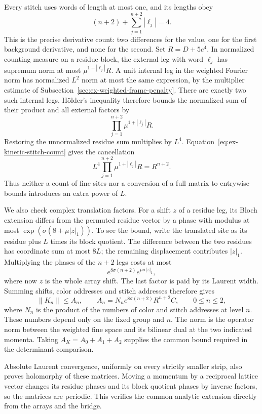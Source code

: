 Every stitch uses words of length at most one, and its lengths obey
\begin{equation}\label{eq:ex-kinetic-stitch-count}
                  (n+2)+\sum_{j=1}^{n+2}|\ell_j|=4.
\end{equation}
This is the precise derivative count: two differences for the value,
one for the first background derivative, and none for the second.
Set $R=D+5e^4$. In normalized counting measure on a residue block,
the external leg with word $\ell_j$ has supremum norm at most
$\mu^{1+|\ell_j|}R$. A unit internal leg in the weighted Fourier
norm has normalized $L^2$ norm at most the same expression, by
the multiplier estimate of
Subsection~\ref{sec:ex-weighted-frame-penalty}. There are exactly
two such internal legs. H\"older's inequality therefore bounds
the normalized sum of their product and all external factors by
\[
                         \prod_{j=1}^{n+2}\mu^{1+|\ell_j|}R.
\]
Restoring the unnormalized residue sum multiplies by $L^4$.
Equation~\eqref{eq:ex-kinetic-stitch-count} gives the cancellation
\[
        L^4\prod_{j=1}^{n+2}\mu^{1+|\ell_j|}R=R^{n+2}.
\]
Thus neither a count of fine sites nor a conversion of a full
matrix to entrywise bounds introduces an extra power of $L$.

We also check complex translation factors. For a shift $z$ of a
residue leg, its Bloch extension differs from the permuted residue
vector by a phase with modulus at most
$\exp(\sigma(8+\mu|z|_1))$. To see the bound, write the translated
site as its residue plus $L$ times its block quotient. The difference
between the two residues has coordinate sum at most $8L$; the
remaining displacement contributes $|z|_1$. Multiplying the phases
of the $n+2$ legs costs at most
\[
                 e^{8\sigma(n+2)}e^{\mu\sigma|z|_1},
\]
where now $z$ is the whole array shift. The last factor is paid
by its Laurent width. Summing shifts, color addresses and stitch
addresses therefore gives
\begin{equation}\label{eq:ex-selected-kinetic-bound}
 \|K_n\|\leq A_n,
 \qquad A_n=N_n e^{8\sigma(n+2)}R^{n+2}C,
 \qquad 0\leq n\leq2,
\end{equation}
where $N_n$ is the product of the numbers of color and stitch
addresses at level $n$. These numbers depend only on the fixed
group and $n$. The norm is the operator norm between the weighted
fine space and its bilinear dual at the two indicated momenta.
Taking $A_K=A_0+A_1+A_2$ supplies the common bound required in
the determinant comparison.

Absolute Laurent convergence, uniformly on every strictly smaller
strip, also proves holomorphy of these matrices. Moving a momentum
by a reciprocal lattice vector changes its residue phases and its
block quotient phases by inverse factors, so the matrices are
periodic. This verifies the common analytic extension directly
from the arrays and the bridge.

